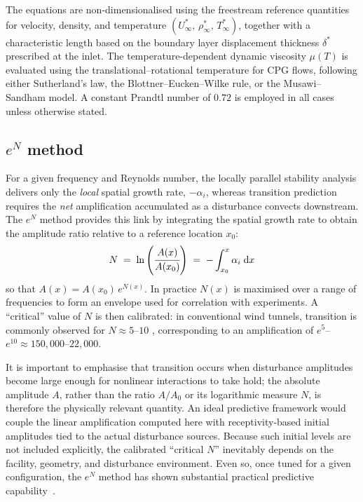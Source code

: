 The equations are non-dimensionalised using the freestream reference quantities for velocity, density, and temperature $(U_\infty^*,\,\rho_\infty^*,\,T_\infty^*)$, together with a characteristic length based on the boundary layer displacement thickness $\delta^{*}$ prescribed at the inlet. The temperature-dependent dynamic viscosity $\mu(T)$ is evaluated using the translational--rotational temperature for \gls{CPG} flows, following either Sutherland's law, the Blottner--Eucken--Wilke rule, or the Musawi--Sandham model. A constant Prandtl number of $0.72$ is employed in all cases unless otherwise stated.

\subsection{$e^N$ method}

For a given frequency and Reynolds number, the locally parallel stability analysis delivers only the \emph{local} spatial growth rate, $- \alpha_i$, whereas transition prediction requires the \emph{net} amplification accumulated as a disturbance convects downstream. The $e^N$ method \citep{SmithGamberoni1956,VanIngen1956} provides this link by integrating the spatial growth rate to obtain the amplitude ratio relative to a reference location $x_0$: %
\begin{equation}
    N \;=\; \ln{ \left( \cfrac{A(x)}{A(x_0)} \right )} \;=\; - \int_{x_0}^{x} \alpha_i \; \mathrm{d} x
\end{equation}
so that $A(x)=A(x_0)\,e^{N(x)}$. In practice $N(x)$ is maximised over a range of frequencies to form an envelope used for correlation with experiments. A ``critical'' value of $N$ is then calibrated: in conventional wind tunnels, transition is commonly observed for $N \approx 5$--$10$ \citep{Schneider2015}, corresponding to an amplification of $e^{5}$--$e^{10}\!\approx\!150{,}000$--$22{,}000$.

It is important to emphasise that transition occurs when disturbance amplitudes become large enough for nonlinear interactions to take hold; the absolute amplitude $A$, rather than the ratio $A/A_0$ or its logarithmic measure $N$, is therefore the physically relevant quantity. An ideal predictive framework would couple the linear amplification computed here with receptivity-based initial amplitudes tied to the actual disturbance sources. Because such initial levels are not included explicitly, the calibrated ``critical $N$'' inevitably depends on the facility, geometry, and disturbance environment. Even so, once tuned for a given configuration, the $e^N$ method has shown substantial practical predictive capability~\citep{Fedorov2011}.


